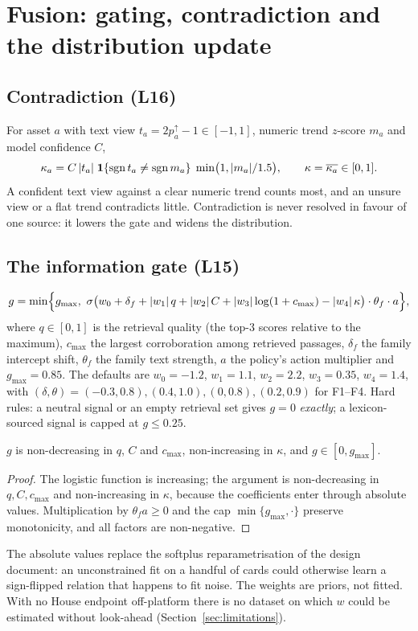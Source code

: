 \section{Fusion: gating, contradiction and the distribution update}\label{sec:fusion}

\subsection{Contradiction (L16)}

For asset $a$ with text view $t_a=2p^\uparrow_a-1\in[-1,1]$, numeric trend $z$-score $m_a$ and model confidence $C$,
\begin{equation}
  \kappa_a = C\,|t_a|\;\mathbf{1}\{\operatorname{sgn} t_a\ne\operatorname{sgn} m_a\}\;\min\bigl(1,|m_a|/1.5\bigr),\qquad \kappa=\overline{\kappa_a}\in[0,1].
\end{equation}
A confident text view against a clear numeric trend counts most, and an unsure view or a flat trend contradicts little. Contradiction is never
resolved in favour of one source: it lowers the gate and widens the distribution.

\subsection{The information gate (L15)}

\begin{equation}\label{eq:gate}
  g=\min\Bigl\{g_{\max},\ \sigma\bigl(w_0+\delta_f+|w_1|\,q+|w_2|\,C+|w_3|\log(1+c_{\max})-|w_4|\,\kappa\bigr)\cdot\theta_f\cdot a\Bigr\},
\end{equation}
where $q\in[0,1]$ is the retrieval quality (the top-$3$ scores relative to the maximum), $c_{\max}$ the largest corroboration among retrieved
passages, $\delta_f$ the family intercept shift, $\theta_f$ the family text strength, $a$ the policy's action multiplier and $g_{\max}=0.85$. The
defaults are $w_0=-1.2$, $w_1=1.1$, $w_2=2.2$, $w_3=0.35$, $w_4=1.4$, with $(\delta,\theta)=(-0.3,0.8),(0.4,1.0),(0,0.8),(0.2,0.9)$ for F1--F4.
Hard rules: a neutral signal or an empty retrieval set gives $g=0$ \emph{exactly}; a lexicon-sourced signal is capped at $g\le0.25$.

\begin{proposition}[Monotonicity]\label{prop:gate}
$g$ is non-decreasing in $q$, $C$ and $c_{\max}$, non-increasing in $\kappa$, and $g\in[0,g_{\max}]$.
\end{proposition}
\begin{proof}
The logistic function is increasing; the argument is non-decreasing in $q,C,c_{\max}$ and non-increasing in $\kappa$, because the coefficients
enter through absolute values. Multiplication by $\theta_fa\ge0$ and the cap $\min\{g_{\max},\cdot\}$ preserve monotonicity, and all factors are
non-negative.
\end{proof}
The absolute values replace the softplus reparametrisation of the design document: an unconstrained fit on a handful of cards could otherwise learn
a sign-flipped relation that happens to fit noise. The weights are priors, not fitted. With no House endpoint off-platform there is no dataset on
which $w$ could be estimated without look-ahead (Section~\ref{sec:limitations}).

